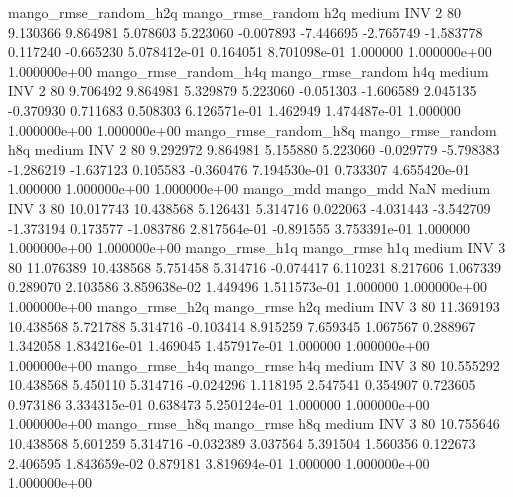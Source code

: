 mango_rmse_random_h2q mango_rmse_random                  h2q     medium      INV                 2 80  9.130366       9.864981 5.078603       5.223060   -0.007893     -7.446695     -2.765749    -1.583778       0.117240 -0.665230 5.078412e-01     0.164051   8.701098e-01            1.000000    1.000000e+00        1.000000e+00
mango_rmse_random_h4q mango_rmse_random                  h4q     medium      INV                 2 80  9.706492       9.864981 5.329879       5.223060   -0.051303     -1.606589      2.045135    -0.370930       0.711683  0.508303 6.126571e-01     1.462949   1.474487e-01            1.000000    1.000000e+00        1.000000e+00
mango_rmse_random_h8q mango_rmse_random                  h8q     medium      INV                 2 80  9.292972       9.864981 5.155880       5.223060   -0.029779     -5.798383     -1.286219    -1.637123       0.105583 -0.360476 7.194530e-01     0.733307   4.655420e-01            1.000000    1.000000e+00        1.000000e+00
            mango_mdd         mango_mdd                  NaN     medium      INV                 3 80 10.017743      10.438568 5.126431       5.314716    0.022063     -4.031443     -3.542709    -1.373194       0.173577 -1.083786 2.817564e-01    -0.891555   3.753391e-01            1.000000    1.000000e+00        1.000000e+00
       mango_rmse_h1q        mango_rmse                  h1q     medium      INV                 3 80 11.076389      10.438568 5.751458       5.314716   -0.074417      6.110231      8.217606     1.067339       0.289070  2.103586 3.859638e-02     1.449496   1.511573e-01            1.000000    1.000000e+00        1.000000e+00
       mango_rmse_h2q        mango_rmse                  h2q     medium      INV                 3 80 11.369193      10.438568 5.721788       5.314716   -0.103414      8.915259      7.659345     1.067567       0.288967  1.342058 1.834216e-01     1.469045   1.457917e-01            1.000000    1.000000e+00        1.000000e+00
       mango_rmse_h4q        mango_rmse                  h4q     medium      INV                 3 80 10.555292      10.438568 5.450110       5.314716   -0.024296      1.118195      2.547541     0.354907       0.723605  0.973186 3.334315e-01     0.638473   5.250124e-01            1.000000    1.000000e+00        1.000000e+00
       mango_rmse_h8q        mango_rmse                  h8q     medium      INV                 3 80 10.755646      10.438568 5.601259       5.314716   -0.032389      3.037564      5.391504     1.560356       0.122673  2.406595 1.843659e-02     0.879181   3.819694e-01            1.000000    1.000000e+00        1.000000e+00
